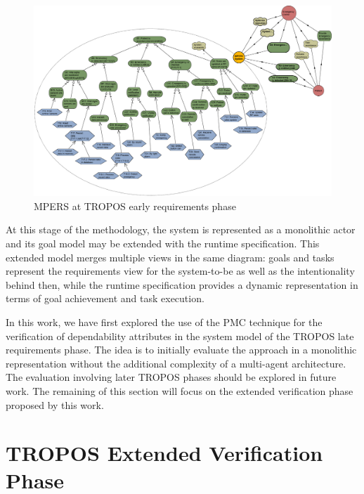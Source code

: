 \begin{figure}[h!]
\centering
\includegraphics[width=1\textwidth]{imgs/MPERS_LR.png}
\caption{MPERS at TROPOS early requirements phase}
\label{fig:MPERS_LR}
\end{figure}

At this stage of the methodology, the system is represented as a monolithic actor and its goal model may be extended with the runtime specification. This extended model merges multiple views in the same diagram: goals and tasks represent the requirements view for the system-to-be as well as the intentionality behind then, while the runtime specification provides a dynamic representation in terms of goal achievement  and task execution.

In this work, we have first explored the use of the PMC technique for the verification of dependability attributes in the system model of the TROPOS late requirements phase. The idea is to initially evaluate the approach in a monolithic representation without the additional complexity of a multi-agent architecture. The evaluation involving later TROPOS phases should be explored in future work. The remaining of this section will focus on the extended verification phase proposed by this work.

\section{TROPOS Extended Verification Phase}


